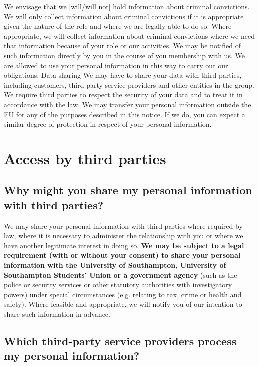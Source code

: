 \documentclass[12pt]{article}
\begin{document}
We envisage that we [will/will not] hold information about criminal convictions. 
We will only collect information about criminal convictions if it is appropriate given the nature of the role and where we are legally able to do so. Where appropriate, we will collect information about criminal convictions where we need that information because of your role or our activities.  We may be notified of such information directly by you in the course of you membership with us. 
We are allowed to use your personal information in this way to carry out our obligations.
Data sharing
We may have to share your data with third parties, including customers, third-party service providers and other entities in the group.
We require third parties to respect the security of your data and to treat it in accordance with the law.
We may transfer your personal information outside the EU for any of the purposes described in this notice.
If we do, you can expect a similar degree of protection in respect of your personal information.

\section{Access by third parties}

\subsection{Why might you share my personal information with third parties?}

We may share your personal information with third parties where required by law, where it is necessary to administer the relationship with you or where we have another legitimate interest in doing so. \textbf{We may be subject to a legal requirement (with or without your consent) to share your personal information with the University of Southampton, University of Southampton Students’ Union or a government agency} (such as the police or security services or other statutory authorities with investigatory powers) under special circumstances (e.g. relating to tax, crime or health and safety).  Where feasible and appropriate, we will notify you of our intention to share such information in advance.  

\subsection{Which third-party service providers process my personal information?}
\end{document}
